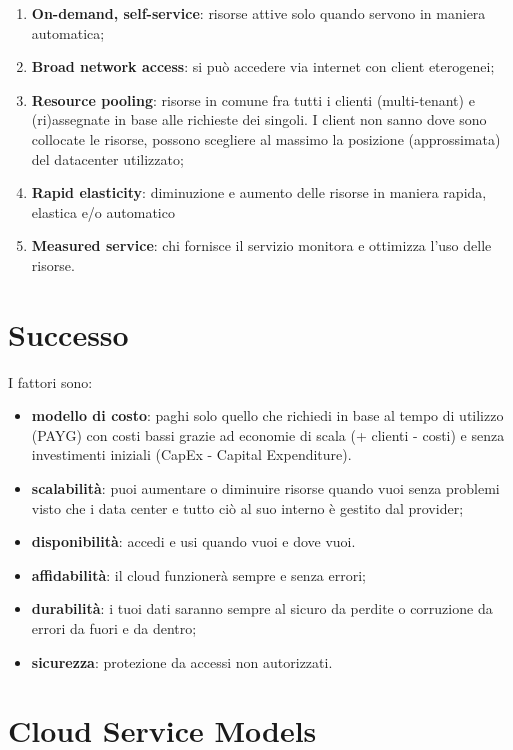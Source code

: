 \begin{enumerate}
\def\labelenumi{\arabic{enumi}.}
\item
  \textbf{On-demand, self-service}: risorse attive solo quando servono
  in maniera automatica;
\item
  \textbf{Broad network access}: si può accedere via internet con client
  eterogenei;
\item
  \textbf{Resource pooling}: risorse in comune fra tutti i clienti
  (multi-tenant) e (ri)assegnate in base alle richieste dei singoli. I
  client non sanno dove sono collocate le risorse, possono scegliere al
  massimo la posizione (approssimata) del datacenter utilizzato;
\item
  \textbf{Rapid elasticity}: diminuzione e aumento delle risorse in
  maniera rapida, elastica e/o automatico
\item
  \textbf{Measured service}: chi fornisce il servizio monitora e
  ottimizza l'uso delle risorse.
\end{enumerate}

\section{Successo}\label{successo}

I fattori sono:

\begin{itemize}
\item
  \textbf{modello di costo}: paghi solo quello che richiedi in base al
  tempo di utilizzo (PAYG) con costi bassi grazie ad economie di scala
  (+ clienti - costi) e senza investimenti iniziali (CapEx - Capital
  Expenditure).
\item
  \textbf{scalabilità}: puoi aumentare o diminuire risorse quando vuoi
  senza problemi visto che i data center e tutto ciò al suo interno è
  gestito dal provider;
\item
  \textbf{disponibilità}: accedi e usi quando vuoi e dove vuoi.
\item
  \textbf{affidabilità}: il cloud funzionerà sempre e senza errori;
\item
  \textbf{durabilità}: i tuoi dati saranno sempre al sicuro da perdite o
  corruzione da errori da fuori e da dentro;
\item
  \textbf{sicurezza}: protezione da accessi non autorizzati.
\end{itemize}

\section{Cloud Service Models}\label{cloud-service-models}

